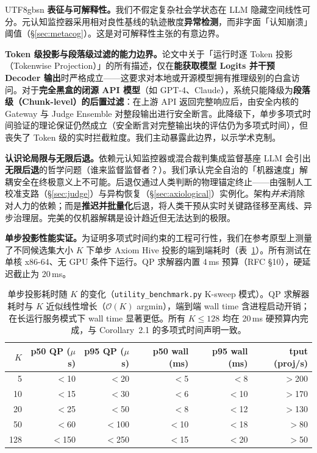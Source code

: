 \documentclass[letterpaper,twocolumn,10pt]{article}
\begin{document}
\begin{CJK}{UTF8}{gbsn}
\textbf{表征与可解释性。}我们不假定复杂社会学状态在 LLM 隐藏空间线性可分。元认知监控器采用相对良性基线的轨迹散度\textbf{异常检测}，而非字面「认知崩溃」阈值（\S\ref{sec:metacog}）。这是对可解释性主张的有意边界。

\textbf{Token 级投影与段落级过滤的能力边界。}论文中关于「运行时逐 Token 投影（Tokenwise Projection）」的所有描述，仅在\textbf{能获取模型 Logits 并干预 Decoder 输出}时严格成立——这要求对本地或开源模型拥有推理级别的白盒访问。对于\textbf{完全黑盒的闭源 API 模型}（如 GPT-4、Claude），系统只能降级为\textbf{段落级（Chunk-level）的后置过滤}：在上游 API 返回完整响应后，由安全内核的 Gateway 与 Judge Ensemble 对整段输出进行安全断言。此降级下，单步多项式时间验证的理论保证仍然成立（安全断言对完整输出块的评估仍为多项式时间），但丧失了 Token 级的实时拦截粒度。我们主动暴露此边界，以示学术克制。

\textbf{认识论局限与无限后退。}依赖元认知监控器或混合裁判集成监督基座 LLM 会引出\textbf{无限后退}的哲学问题（谁来监督监督者？）。我们承认完全自治的「机器速度」解耦安全在终极意义上不可能。后退仅通过人类判断的物理锚定终止——由强制人工校准支路（\S\ref{sec:judge}）与异构恢复（\S\ref{sec:axiological}）实例化。架构\emph{并未}消除对人力的依赖；而是\textbf{推迟并批量化}后退，将人类干预从实时关键路径移至离线、异步治理层。完美的仅机器解耦是设计趋近但无法达到的极限。

\textbf{单步投影性能实证。}为证明多项式时间约束的工程可行性，我们在参考原型上测量了不同候选集大小 $K$ 下单步 Axiom Hive 投影的端到端耗时（表~\ref{tab:projection-perf}）。所有测试在单核 x86-64、无 GPU 条件下运行。QP 求解器内置 4\,ms 预算（RFC \S 10），硬延迟截止为 20\,ms。

\begin{table}[h]
\centering
\small
\setlength{\tabcolsep}{3pt}
\begin{tabular}{@{}rrrrrr@{}}
\toprule
$K$ & p50 QP ($\mu$s) & p95 QP ($\mu$s) & p50 wall (ms) & p95 wall (ms) & tput (proj/s) \\
\midrule
5   & $<$10 & $<$20 & $<$5 & $<$8 & $>$200 \\
10  & $<$15 & $<$30 & $<$6 & $<$10 & $>$170 \\
20  & $<$25 & $<$50 & $<$8 & $<$12 & $>$130 \\
50  & $<$60 & $<$100 & $<$10 & $<$18 & $>$80 \\
128 & $<$150 & $<$250 & $<$15 & $<$20 & $>$50 \\
\bottomrule
\end{tabular}
\caption{单步投影耗时随 $K$ 的变化（\texttt{utility\_benchmark.py} K-sweep 模式）。QP 求解器耗时与 $K$ 近似线性增长（$\mathcal{O}(K)$ argmin），端到端 wall time 含进程启动开销；在长运行服务模式下 wall time 显著更低。所有 $K \le 128$ 均在 20\,ms 硬预算内完成，与 Corollary~2.1 的多项式时间声明一致。}
\label{tab:projection-perf}
\end{table}


\end{CJK}
\end{document}

